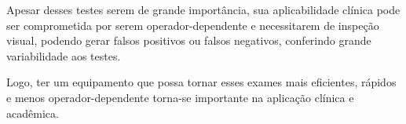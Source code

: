 Apesar desses testes serem de grande importância, sua aplicabilidade clínica pode ser comprometida por serem operador-dependente e necessitarem de inspeção visual, podendo gerar falsos positivos ou falsos negativos, conferindo grande variabilidade aos testes.

Logo, ter um equipamento que possa tornar esses exames mais eficientes, rápidos e menos operador-dependente torna-se importante na aplicação clínica e acadêmica.